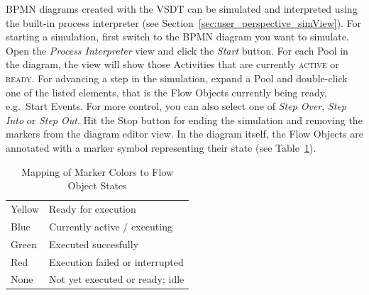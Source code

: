 BPMN diagrams created with the VSDT can be simulated and interpreted using the built-in process interpreter (see Section~\ref{sec:user_perspective_simView}).  For starting a simulation, first switch to the BPMN diagram you want to simulate. Open the \emph{Process Interpreter} view and click the \emph{Start} button.  For each Pool in the diagram, the view will show those Activities that are currently \textsc{active} or \textsc{ready}.  For advancing a step in the simulation, expand a Pool and double-click one of the listed elements, that is the Flow Objects currently being ready, e.g.\ Start Events.  For more control, you can also select one of \emph{Step Over}, \emph{Step Into} or \emph{Step Out}.  Hit the Stop button for ending the simulation and removing the markers from the diagram editor view.  In the diagram itself, the Flow Objects are annotated with a marker symbol representing their state (see Table~\ref{tab:markerColors}).
\begin{table}[ht]
	\centering
	\caption{Mapping of Marker Colors to Flow Object States}
	\label{tab:markerColors}
	\begin{tabular}{|l|l|}
		\hline
		Yellow & Ready for execution             \\
		Blue   & Currently active / executing    \\
		Green  & Executed succesfully            \\
		Red    & Execution failed or interrupted \\
		None   & Not yet executed or ready; idle \\
		\hline
	\end{tabular}
\end{table}

